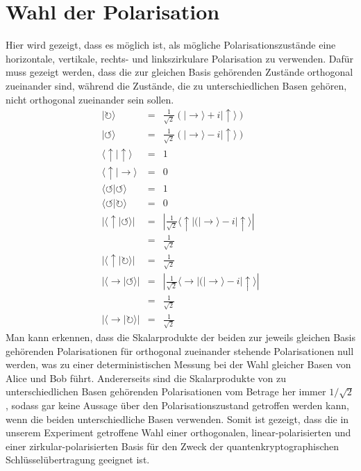 \section{Wahl der Polarisation}
\label{sec:zirkular}
Hier wird gezeigt, dass es möglich ist, als mögliche Polarisationszustände eine
horizontale, vertikale, rechts- und linkszirkulare Polarisation zu verwenden.
Dafür muss gezeigt werden, dass die zur gleichen Basis gehörenden Zustände
orthogonal zueinander sind, während die Zustände, die zu unterschiedlichen
Basen gehören, nicht orthogonal zueinander sein sollen.
\begin{eqnarray}
| \circlearrowright \rangle &=& \frac{1}{\sqrt{2}}(|\rightarrow\rangle +
i|\uparrow\rangle)\\
| \circlearrowleft \rangle &=& \frac{1}{\sqrt{2}}(|\rightarrow\rangle -
i|\uparrow\rangle)\\
\langle\uparrow|\uparrow\rangle &=& 1\\
\langle\uparrow|\rightarrow\rangle &=& 0\\
\langle\circlearrowleft|\circlearrowleft \rangle &=& 1\\
\langle\circlearrowleft|\circlearrowright \rangle &=& 0\\
|\langle\uparrow|\circlearrowleft \rangle| &=&
\left|\frac{1}{\sqrt{2}}\langle\uparrow|(|\rightarrow\rangle -
i|\uparrow\rangle\right|\\
 &=& \frac{1}{\sqrt{2}}\\
|\langle\uparrow|\circlearrowright \rangle| &=& \frac{1}{\sqrt{2}}\\
|\langle\rightarrow|\circlearrowleft \rangle| &=&
\left|\frac{1}{\sqrt{2}}\langle\rightarrow|(|\rightarrow\rangle -
i|\uparrow\rangle\right|\\
 &=& \frac{1}{\sqrt{2}}\\
|\langle\rightarrow|\circlearrowright \rangle| &=& \frac{1}{\sqrt{2}}
\end{eqnarray}
Man kann erkennen, dass die Skalarprodukte der beiden zur jeweils gleichen
Basis gehörenden Polarisationen für orthogonal zueinander stehende
Polarisationen null werden, was zu einer deterministischen Messung bei der Wahl
gleicher Basen von Alice und Bob führt. Andererseits sind die Skalarprodukte
von zu unterschiedlichen Basen gehörenden Polarisationen vom Betrage her immer
$1/\sqrt{2}$, sodass gar keine Aussage über den Polarisationszustand getroffen
werden kann, wenn die beiden unterschiedliche Basen verwenden. Somit ist
gezeigt, dass die in unserem Experiment getroffene Wahl einer orthogonalen,
linear-polarisierten und einer zirkular-polarisierten Basis für den Zweck der
quantenkryptographischen Schlüsselübertragung geeignet ist.

